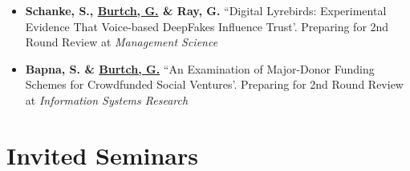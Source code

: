 \documentclass[10.5pt,letterpaper,sans]{moderncv}        %
\begin{document}
\begin{itemize}[leftmargin=!,labelindent=5pt,itemindent=-15pt]

\item \textbf{Schanke, S.,  \underline{Burtch, G.} \& Ray, G.} ``Digital Lyrebirds: Experimental Evidence That Voice-based DeepFakes Influence Trust'. Preparing for 2nd Round Review at \textit{Management Science} 

\item \textbf{Bapna, S. \& \underline{Burtch, G.}} ``An Examination of Major-Donor Funding Schemes for Crowdfunded Social Ventures'. Preparing for 2nd Round Review at \textit{Information Systems Research}

\end{itemize}

\section{Invited Seminars}
\end{document}
